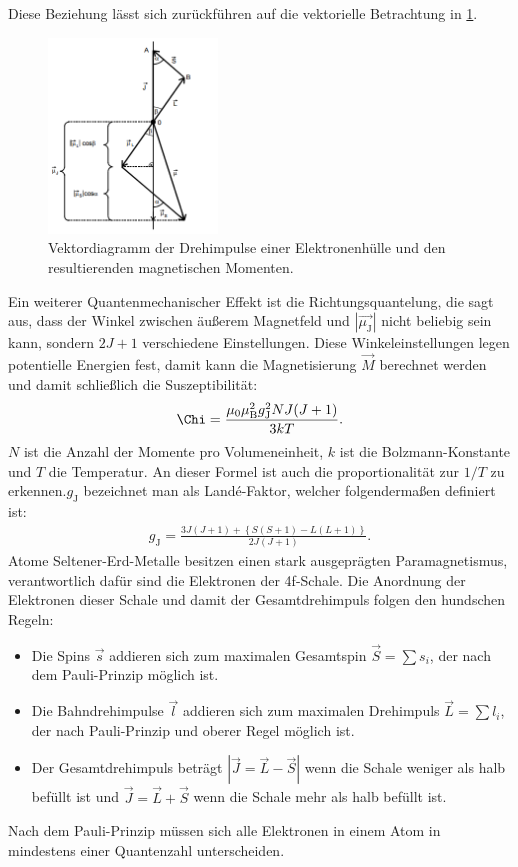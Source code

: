 Diese Beziehung lässt sich zurückführen auf die vektorielle Betrachtung
in \ref{fig:winkel}.
\begin{figure}
 \centering
 \includegraphics[width=0.4\textwidth]{winkel.png}
 \caption{Vektordiagramm der Drehimpulse einer Elektronenhülle und den resultierenden magnetischen Momenten. }
 \label{fig:winkel}
 \end{figure}

Ein weiterer Quantenmechanischer Effekt ist die Richtungsquantelung,
die sagt aus, dass der Winkel zwischen äußerem Magnetfeld und
$|\vec{\mu_\mathrm{J}}|$  nicht beliebig sein kann, sondern $2J+1$
verschiedene Einstellungen. Diese Winkeleinstellungen legen potentielle Energien fest,
damit kann die Magnetisierung $\vec{M}$ berechnet werden und damit schließlich
die Suszeptibilität:
\begin{align}
  \Chi=\frac{\mu_0\mu_\mathrm{B}^2g_\mathrm{J}^2NJ(J+1)}{3kT}.\label{eqn:XT}
\end{align}
$N$ ist die Anzahl der Momente pro Volumeneinheit, $k$ ist die Bolzmann-Konstante und
$T$ die Temperatur. An dieser Formel ist auch die proportionalität zur $1/T$
zu erkennen.$g_\mathrm{J}$ bezeichnet man als Landé-Faktor, welcher folgendermaßen definiert ist:
\begin{align}
  g_\mathrm{J}=\frac{3J(J+1)+\left\{S(S+1)-L(L+1)\right\}}{2J(J+1)}.\label{eqn:lande}
\end{align}
Atome Seltener-Erd-Metalle besitzen einen stark ausgeprägten Paramagnetismus,
verantwortlich dafür sind die Elektronen der 4f-Schale. Die Anordnung der Elektronen dieser
Schale und damit der Gesamtdrehimpuls folgen den hundschen Regeln:
\begin{itemize}
  \item Die Spins $\vec{s}$ addieren sich zum maximalen Gesamtspin
   $\vec{S}=\sum s_i$, der nach dem Pauli-Prinzip möglich ist.
   \item Die Bahndrehimpulse $\vec{l}$ addieren sich zum maximalen Drehimpuls
   $\vec{L}=\sum l_i$, der nach Pauli-Prinzip und oberer Regel möglich ist.
   \item Der Gesamtdrehimpuls beträgt $|\vec{J}=\vec{L}-\vec{S}|$ wenn die
   Schale weniger als halb befüllt ist und $\vec{J}=\vec{L}+\vec{S}$ wenn die
   Schale mehr als halb befüllt ist.
\end{itemize}
Nach dem Pauli-Prinzip müssen sich alle Elektronen in einem Atom in mindestens
einer Quantenzahl unterscheiden.
